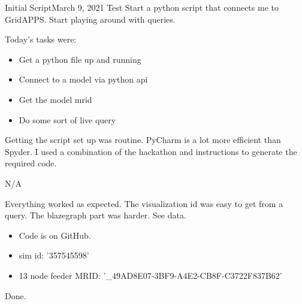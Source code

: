 
\begin{entry}{Initial Script}{March 9, 2021}
    \objective
    Test
    Start a python script that connects me to GridAPPS. Start playing around with queries.

    \outline

    Today's tasks were:
        \begin{itemize}
            \item Get a python file up and running
            \item Connect to a model via python api
            \item Get the model mrid
            \item Do some sort of live query
        \end{itemize}

    \procedures

        Getting the script set up was routine. PyCharm is a lot more efficient than Spyder.
        I used a combination of the hackathon and instructions to generate the required code.

    \parameters

    N/A

    \observations

        Everything worked as expected. The visualization id was easy to get from a query. The
        blazegraph part was harder. See data.

    \data
    \begin{itemize}
        \item Code is on GitHub.
        \item sim id: '357545598'
        \item 13 node feeder MRID: '_49AD8E07-3BF9-A4E2-CB8F-C3722F837B62'
    \end{itemize}




    \results

    Done.

\end{entry}